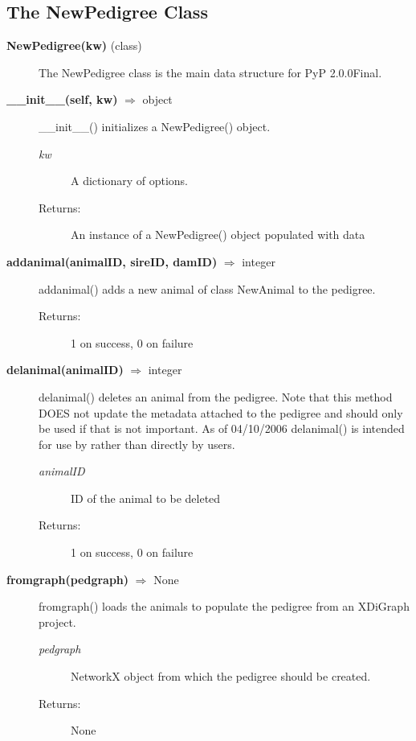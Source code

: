 \subsection*{The NewPedigree Class}
\begin{description}
\item[\textbf{NewPedigree(kw)} (class)]
The NewPedigree class is the main data structure for PyP 2.0.0Final.

\item[\textbf{\_\_init\_\_(self, kw)} $\Rightarrow$ object]
\_\_init\_\_() initializes a NewPedigree() object.
\begin{description}
\item[\emph{kw}] A dictionary of options.
\item[Returns:] An instance of a NewPedigree() object populated with data
\end{description}

\item[\textbf{addanimal(animalID, sireID, damID)} $\Rightarrow$ integer]
addanimal() adds a new animal of class NewAnimal to the pedigree.
\begin{description}
\item[Returns:] 1 on success, 0 on failure
\end{description}

\item[\textbf{delanimal(animalID)} $\Rightarrow$ integer]
delanimal() deletes an animal from the pedigree. Note that this method DOES not update the metadata attached to the pedigree and should only be used if that is not important. As of 04/10/2006 delanimal() is intended for use by  rather than directly by users.
\begin{description}
\item[\emph{animalID}] ID of the animal to be deleted
\item[Returns:] 1 on success, 0 on failure
\end{description}

\item[\textbf{fromgraph(pedgraph)} $\Rightarrow$ None]
fromgraph() loads the animals to populate the pedigree from an XDiGraph project.
\begin{description}
\item[\emph{pedgraph}] NetworkX object from which the pedigree should be created.
\item[Returns:] None
\end{description}


\end{description}
